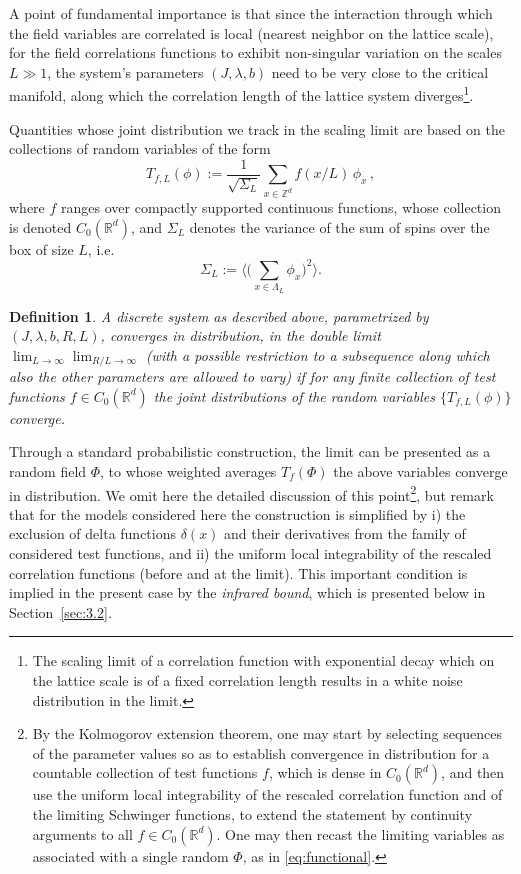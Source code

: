 \documentclass[a4paper,oneside,11pt]{article}
\def\Z{\mathbb{Z}}                          %
\def\R{\mathbb{R}}
\newtheorem{definition}[theorem]{Definition}
\newcommand{\be}[1]{\begin{equation}\label{#1}}
\newcommand{\ee}{\end{equation}}
\numberwithin{equation}{section}
\numberwithin{equation}{section}
\numberwithin{equation}{section}
\def\Z{\mathbb{Z}}                          %
\def\be{\begin{equation}}
\def\ee{\end{equation}}
\begin{document}
A point of fundamental importance is that since the interaction through which the field variables are correlated is local (nearest neighbor on the lattice scale), for  the field correlations functions to exhibit non-singular variation on the scales $L\gg1$, the system's parameters $(J, \lambda, b)$ need to be very close to the critical  manifold, along which the correlation length of the lattice system diverges\footnote{The scaling limit of a correlation function with exponential decay which on the lattice scale is of a fixed correlation length results in a white noise distribution in the limit.}. 

Quantities whose joint distribution we track  in the scaling limit are based on the collections of random variables of the form
\be \label{def_Tf_scaled}
T_{f,L}(\phi) :=  \frac{1}{\sqrt{\Sigma_L}}\sum_{x\in \Z^d} f(x/L ) \, \phi_x   \,,
\ee
where $f$ ranges over compactly supported continuous functions, whose collection is denoted $C_0(\R^d)$, and $\Sigma_L$ denotes the variance of the sum of spins over the box of size $L$, i.e. 
\be
\Sigma_L:=\big\langle\big(\sum_{x\in\Lambda_L}\phi_x\big)^2\big\rangle.
\ee

\begin{definition}  A discrete system as described  above, parametrized by $(J,\lambda,b, R, L)$, {\em converges in distribution},  in the double limit $\lim_{L \to \infty} \lim_{R/L\to \infty}$ (with a possible  restriction to a subsequence along which also the other parameters are  allowed to vary) if 
for any finite collection of test functions $f\in C_0(\R^d)$ the joint distributions of the random variables $\{T_{f,L}(\phi)\}$ converge.
\end{definition} 

Through a standard probabilistic construction,  the limit can be presented as a random field $\Phi$, to whose weighted averages $T_f(\Phi)$ the above variables converge in distribution.   We omit here the detailed discussion of this point\footnote{By the Kolmogorov extension theorem, one may start by selecting  sequences of the parameter values so as to establish convergence in distribution for a countable collection of test functions $f$, which is dense in $C_0(\R^d)$, and then use the uniform local integrability of the rescaled correlation function and of the limiting Schwinger functions, to extend the statement by continuity arguments to all $f\in C_0(\R^d)$.  One may then  recast the limiting variables as associated with a single random $\Phi$, as in \eqref{eq:functional}.}, 
but remark that for the models considered here the construction  is simplified by i) the exclusion of  delta functions $\delta (x)$ and their derivatives from the family of considered test functions, and ii) the uniform local integrability of the  rescaled correlation functions (before and at the limit).  This important  condition is implied in the present case by the \emph{infrared bound}, which is presented below in Section~\ref{sec:3.2}.
\end{document}

